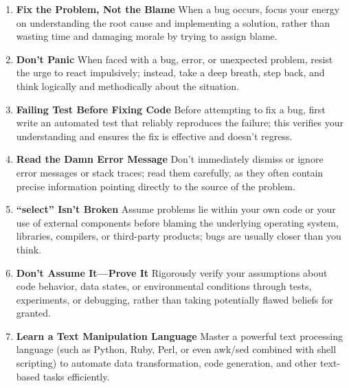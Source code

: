 \documentclass[11pt]{article}
\begin{document}
\begin{tcolorbox}[pragchapterbox={Chapter 4: Pragmatic Paranoia}]
\begin{multicols}{2}
\begin{enumerate}[label=\arabic*., start=29, itemsep=1ex, topsep=0pt, partopsep=0pt, labelwidth=!, labelindent=0pt, leftmargin=*]
    \item \textbf{Fix the Problem, Not the Blame}
    When a bug occurs, focus your energy on understanding the root cause and implementing a solution, rather than wasting time and damaging morale by trying to assign blame.

    \item \textbf{Don’t Panic}
    When faced with a bug, error, or unexpected problem, resist the urge to react impulsively; instead, take a deep breath, step back, and think logically and methodically about the situation.

    \item \textbf{Failing Test Before Fixing Code}
    Before attempting to fix a bug, first write an automated test that reliably reproduces the failure; this verifies your understanding and ensures the fix is effective and doesn't regress.

    \item \textbf{Read the Damn Error Message}
    Don't immediately dismiss or ignore error messages or stack traces; read them carefully, as they often contain precise information pointing directly to the source of the problem.

    \item \textbf{“select” Isn’t Broken}
    Assume problems lie within your own code or your use of external components before blaming the underlying operating system, libraries, compilers, or third-party products; bugs are usually closer than you think.

    \item \textbf{Don’t Assume It—Prove It}
    Rigorously verify your assumptions about code behavior, data states, or environmental conditions through tests, experiments, or debugging, rather than taking potentially flawed beliefs for granted.

    \item \textbf{Learn a Text Manipulation Language}
    Master a powerful text processing language (such as Python, Ruby, Perl, or even awk/sed combined with shell scripting) to automate data transformation, code generation, and other text-based tasks efficiently.


\end{enumerate}
\end{multicols}
\end{tcolorbox}
\end{document}
